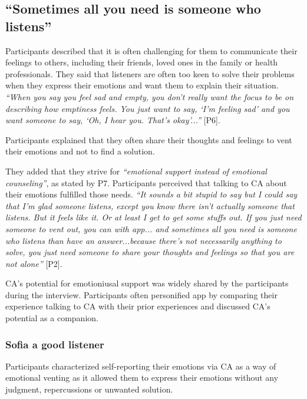     \subsection{``Sometimes all you need is someone who listens''}
        Participants described that it is often challenging for them to communicate their feelings to others, including their friends, loved ones in the family or health professionals. 
        They said that listeners are often too keen to solve their problems when they express their emotions and want them to explain their situation. 
            \textit{``When you say you feel sad and empty, you don't really want the focus to be on describing how emptiness feels. You just want to say, `I'm feeling sad' and you want someone to say, `Oh, I hear you. That's okay'...''} [P6].
                
                
        
        Participants explained that they often share their thoughts and feelings to vent their emotions and not to find a solution. 
        

        They added that they strive for \textit{``emotional support instead of emotional counseling''}, as stated by P7. Participants perceived that talking to \ac{CA} about their emotions fulfilled those needs.
            \textit{``It sounds a bit stupid to say but I could say that I'm glad someone listens, except you know there isn't actually someone that listens. But it feels like it. Or at least I get to get some stuffs out. If you just need someone to vent out, you can with \acl{app}... and sometimes all you need is someone who listens than have an answer...because there's not necessarily anything to solve, you just need someone to share your thoughts and feelings so that you are not alone''} [P2].
    
        \ac{CA}'s potential for emotioniusal support was widely shared by the participants during the interview. Participants often personified \acl{app} by comparing their experience talking to \ac{CA} with their prior experiences and discussed \ac{CA}'s potential as a companion. 

        \subsubsection{Sofia a good listener}
        
        Participants characterized self-reporting their emotions via \ac{CA} as a way of emotional venting as it allowed them to express their emotions without any judgment, repercussions or unwanted solution. 

